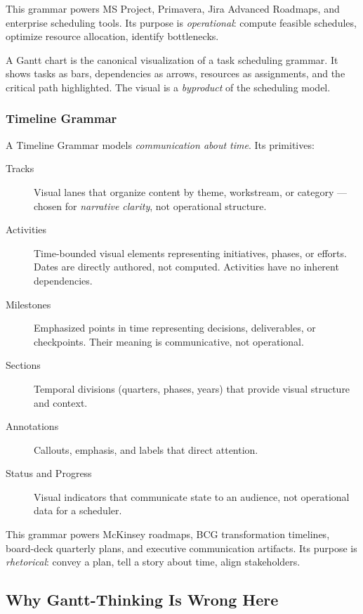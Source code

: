 This grammar powers MS Project, Primavera, Jira Advanced Roadmaps, and enterprise scheduling tools. Its purpose is \emph{operational}: compute feasible schedules, optimize resource allocation, identify bottlenecks.

A Gantt chart is the canonical visualization of a task scheduling grammar. It shows tasks as bars, dependencies as arrows, resources as assignments, and the critical path highlighted. The visual is a \emph{byproduct} of the scheduling model.

\subsubsection{Timeline Grammar}

A Timeline Grammar models \emph{communication about time}. Its primitives:

\begin{description}
  \item[Tracks] Visual lanes that organize content by theme, workstream, or category — chosen for \emph{narrative clarity}, not operational structure.
  
  \item[Activities] Time-bounded visual elements representing initiatives, phases, or efforts. Dates are directly authored, not computed. Activities have no inherent dependencies.
  
  \item[Milestones] Emphasized points in time representing decisions, deliverables, or checkpoints. Their meaning is communicative, not operational.
  
  \item[Sections] Temporal divisions (quarters, phases, years) that provide visual structure and context.
  
  \item[Annotations] Callouts, emphasis, and labels that direct attention.
  
  \item[Status and Progress] Visual indicators that communicate state to an audience, not operational data for a scheduler.
\end{description}

This grammar powers McKinsey roadmaps, BCG transformation timelines, board-deck quarterly plans, and executive communication artifacts. Its purpose is \emph{rhetorical}: convey a plan, tell a story about time, align stakeholders.

\subsection{Why Gantt-Thinking Is Wrong Here}


